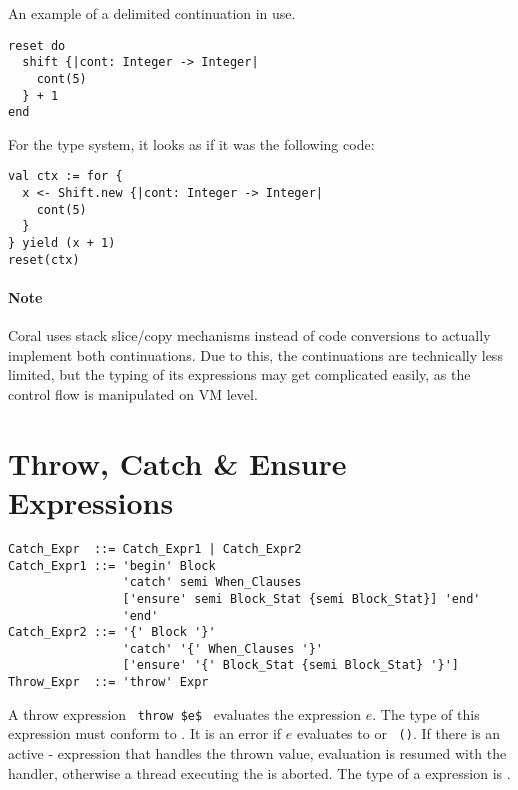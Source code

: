 \example An example of a delimited continuation in use. 
\begin{lstlisting}
reset do
  shift {|cont: Integer -> Integer|
    cont(5)
  } + 1
end
\end{lstlisting}
For the type system, it looks as if it was the following code:
\begin{lstlisting}
val ctx := for {
  x <- Shift.new {|cont: Integer -> Integer|
    cont(5)
  }
} yield (x + 1)
reset(ctx)
\end{lstlisting}

\paragraph{Note}
Coral uses stack slice/copy mechanisms instead of code conversions to actually implement both continuations. Due to this, the continuations are technically less limited, but the typing of its expressions may get complicated easily, as the control flow is manipulated on VM level.






\section{Throw, Catch \& Ensure Expressions}
\label{sec:throw-catch-expressions}

\syntax\begin{lstlisting}
Catch_Expr  ::= Catch_Expr1 | Catch_Expr2
Catch_Expr1 ::= 'begin' Block 
                'catch' semi When_Clauses
                ['ensure' semi Block_Stat {semi Block_Stat}] 'end'
                'end'
Catch_Expr2 ::= '{' Block '}'
                'catch' '{' When_Clauses '}'
                ['ensure' '{' Block_Stat {semi Block_Stat} '}']
Throw_Expr  ::= 'throw' Expr
\end{lstlisting}

A throw expression ~\lstinline!throw $e$!~ evaluates the expression $e$. The type of this expression must conform to . It is an error if $e$ evaluates to  or ~\lstinline!()!. If there is an active - expression that handles the thrown value, evaluation is resumed with the handler, otherwise a thread executing the  is aborted. The type of a  expression is . 


